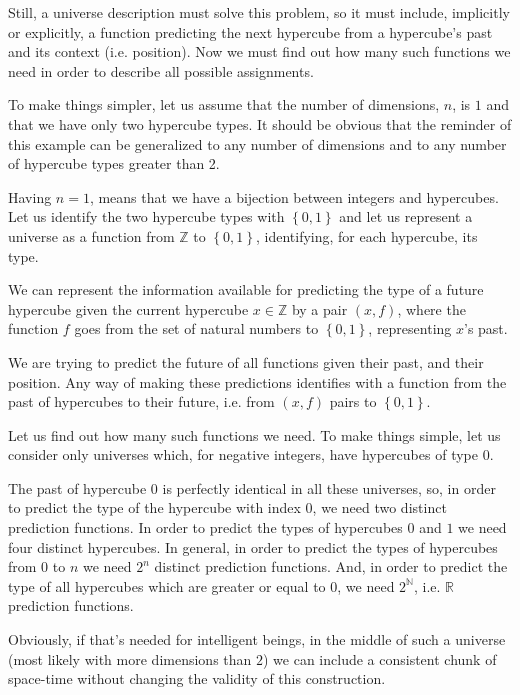 \documentclass[a4paper
,draft
]{article}
\def\reale{\mathbb{R}}
\def\intregi{\mathbb{Z}}
\def\naturale{\mathbb{N}}
\newcommand{\multime}[1]{\left\{ #1 \right\}}
\begin{document}
Still, a universe description must solve this problem, so it must include,
implicitly or explicitly,
a function predicting the next hypercube from a hypercube's past
and its context (i.e. position). Now we must find out how many such functions
we need in order to describe all possible assignments.

To make things simpler, let us assume that the number of dimensions, $n$,
is $1$ and that we have only two hypercube types.
It should be obvious that
the reminder of this example can be generalized to any number of dimensions
and to any number of hypercube types greater than 2.

Having $n=1$, means that we have a bijection between integers and hypercubes.
Let us identify the two hypercube types with $\multime{0, 1}$ and
let us represent a universe as a function from $\intregi$ to $\multime{0, 1}$,
identifying, for each hypercube, its type.

We can represent the information available for predicting the type of a future
hypercube given the current hypercube $x\in\intregi$ by a pair $(x, f)$,
where the function
$f$ goes from the set of natural numbers to $\multime{0,1}$, representing
$x$'s past.

We are trying to predict the future of all functions given
their past, and their position.
Any way of making these predictions identifies with a function from the past
of hypercubes to their future, i.e. from $(x, f)$ pairs to $\multime{0, 1}$.

Let us find out how many such functions we need.
To make things simple, let us consider only universes which, for negative
integers, have hypercubes of type $0$.

The past of hypercube $0$ is perfectly identical in all these universes, so,
in order to predict the type of the hypercube with index $0$,
we need two distinct prediction functions.
In order to predict the types of hypercubes $0$ and $1$ we need four
distinct hypercubes.
In general, in order to predict the types of hypercubes from $0$ to $n$
we need $2^n$ distinct prediction functions.
And, in order to predict the type of all hypercubes which are greater or equal
to $0$, we need $2^\naturale$, i.e. $\reale$ prediction functions.

Obviously, if that's needed for intelligent beings,
in the middle of such a universe (most likely with more dimensions than $2$)
we can include a consistent chunk
of space-time without changing the validity of this construction.
\end{document}
